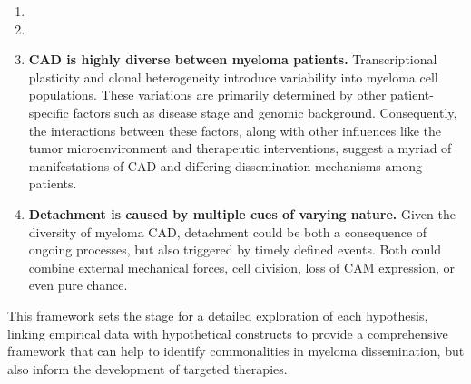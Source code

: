 \newcommand{\cadddiversity}{%
      \textbf{\ac{CAD} is highly diverse between myeloma patients.}
      Transcriptional plasticity and clonal heterogeneity introduce variability
      into myeloma cell populations. These variations are primarily determined
      by other patient-specific factors such as disease stage and genomic
      background. Consequently, the interactions between these factors, along
      with other influences like the tumor microenvironment and therapeutic
      interventions, suggest a myriad of manifestations of \ac{CAD} and
      differing dissemination mechanisms among patients. }%
\newcommand{\cadddiversitytitle}{ %
      \textit{Hypothesis 3}: CAD is Highly Diverse Between Myeloma Patients%
}%


\newcommand{\caddtrigger}{%
      \textbf{Detachment is caused by multiple cues of varying nature.} Given
      the diversity of myeloma \ac{CAD}, detachment could be both a consequence
      of ongoing processes, but also triggered by timely defined events. Both
      could combine external mechanical forces, cell division, loss
      of \ac{CAM} expression, or even pure chance. }%
\newcommand{\caddtriggertitle}{ %
      \textit{Hypothesis 4}: Detachment is Caused by Multiple Cues of Varying
      Nature %
}%





\begin{enumerate}[parsep=4pt]
      \item \caddramatype
      \item \cadplasticity
      \item \cadddiversity
      \item \caddtrigger
\end{enumerate}


This framework sets the stage for a detailed exploration of each hypothesis,
linking empirical data with hypothetical constructs to provide a comprehensive
framework that can help to identify commonalities in myeloma dissemination, but
also inform the development of targeted therapies.




